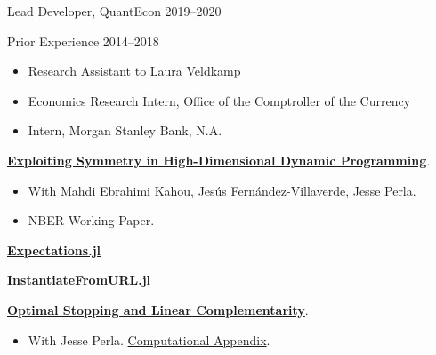 \documentclass[12pt,article,oneside]{memoir}   %
\begin{document}
Lead Developer, QuantEcon \hfill 2019--2020\vspace{0.1in}

Prior Experience \hfill 2014--2018
\begin{itemize}\setlength{\leftskip}{1cm}
  \item Research Assistant to Laura Veldkamp
  \item Economics Research Intern, Office of the Comptroller of the Currency
  \item Intern, Morgan Stanley Bank, N.A.
\end{itemize}

{\vskip 0.1in}
\bigskip


\setlength{\leftskip}{0cm}

\textbf{\href{https://www.nber.org/papers/w28981}{Exploiting Symmetry in High-Dimensional Dynamic Programming}}. 
\begin{itemize}
  \setlength{\leftskip}{1cm} \item  With Mahdi Ebrahimi Kahou, Jes\'{u}s Fern\'{a}ndez-Villaverde, Jesse Perla.
  \item NBER Working Paper.
\end{itemize} 

{\vskip 0.1in}
\bigskip

\setlength{\leftskip}{0cm}

\textbf{\href{https://github.com/QuantEcon/expectations.jl}{Expectations.jl}}  \vspace{0.1in}

\textbf{\href{https://github.com/QuantEcon/InstantiateFromURL.jl}{InstantiateFromURL.jl}}  

{\vskip 0.1in}
\bigskip

\setlength{\leftskip}{0cm}

\textbf{\href{https://notes.quantecon.org/submission/5c832d2be7b4c5000f4c8e48}{Optimal Stopping and Linear Complementarity}}. 
\begin{itemize}
  \setlength{\leftskip}{1cm} \item  With Jesse Perla. \href{https://quantecon.github.io/SimpleDifferentialOperators.jl/v0.4/generated/LCP_advanced.html}{Computational Appendix}.
\end{itemize} \vspace{0.1in}

\end{document}
